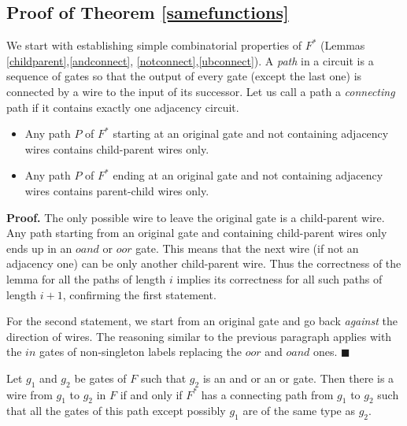 \documentclass{llncs}
\begin{document}
\subsection{Proof of Theorem \ref{samefunctions}} \label{samef}
We start with establishing simple combinatorial properties of $F^*$ (Lemmas \ref{childparent},\ref{andconnect},
\ref{notconnect},\ref{ubconnect}). 
A \emph{path} in a circuit is a sequence of gates so that the output of every gate (except the last one) is connected by a wire to the input of its successor. 
Let us call a path a \emph{connecting} path if it contains exactly one adjacency circuit.

\begin{lemma} \label{childparent}

\begin{itemize}
\item Any path $P$ of $F^*$ starting at an original gate and not containing adjacency wires contains
child-parent wires only.
\item Any path $P$ of $F^*$ ending at an original gate and not containing adjacency wires contains
parent-child wires only. 
\end{itemize}

\end{lemma}

{\bf Proof.}
The only possible wire to leave the original gate is a child-parent wire.
Any path starting from an original gate and containing child-parent wires only 
ends up in an $oand$ or $oor$ gate.  This means that the next wire (if not an adjacency one)
can be only another child-parent wire. Thus the correctness of the lemma for all
the paths of length $i$ implies its correctness for all such paths of length $i+1$,
confirming the first statement. 

For the second statement, we start from an original gate and go back \emph{against}
the direction of wires. The reasoning similar to the previous paragraph applies 
with the $in$ gates of non-singleton labels replacing the $oor$ and $oand$ ones.
$\blacksquare$  

\begin{lemma} \label{andconnect}
Let $g_1$ and $g_2$ be gates of $F$ such that $g_2$ is an {\sc and} or
an {\sc or} 
gate. Then there is a wire from $g_1$ to $g_2$ in $F$ if and only if
$F^*$ has a connecting path from $g_1$ to $g_2$ 
such that all the gates of this path except possibly $g_1$ are of the same type
as $g_2$.
\end{lemma}
\end{document}
